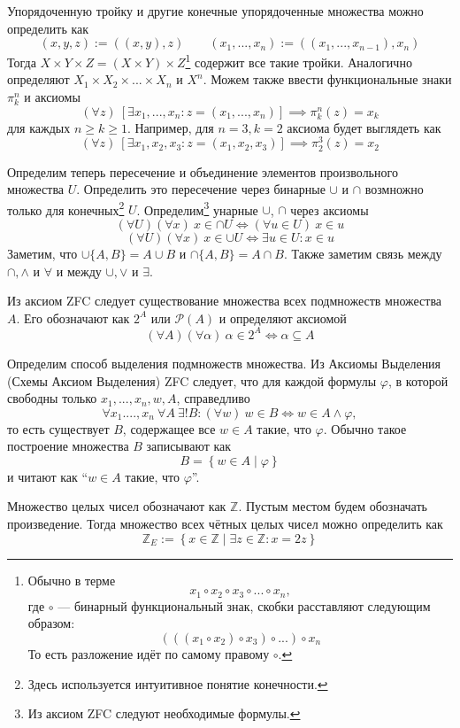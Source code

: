 Упорядоченную тройку и другие конечные упорядоченные множества
можно определить как
\[
  (x,y,z):=((x,y),z)\qquad (x_1,...,x_{n}):=((x_1,...,x_{n-1}),x_{n})
\]
Тогда $X\times Y\times Z=(X\times Y)\times Z$\footnote{
  Обычно в терме
  \[
    x_1\circ x_2\circ x_3\circ...\circ x_{n},
  \]
  где $\circ$ --- бинарный функциональный знак,
  скобки расставляют следующим образом:
  \[
    (((x_1\circ x_2)\circ x_3)\circ...)\circ x_{n}
  \]
  То есть разложение идёт по самому правому $\circ$.
} содержит все такие тройки.
Аналогично определяют $X_1\times X_2\times ...\times X_{n}$ и $X^{n}$.
Можем также ввести функциональные знаки $\pi_{k}^{n}$ и аксиомы
\[
  (\forall z)~[\exists x_1,...,x_{n}:z=(x_1,...,x_{n})]\implies \pi_{k}^{n}(z)=x_{k}
\]
для каждых $n\geq k\geq 1$. Например, для $n=3,k=2$ аксиома
будет выглядеть как
\[
  (\forall z)~[\exists x_1,x_2,x_3:z=(x_1,x_2,x_3)]\implies \pi_2^{3}(z)=x_2
\]

Определим теперь пересечение и объединение элементов произвольного множества $U$.
Определить это пересечение через бинарные $\cup$ и $\cap$
возмножно только для конечных\footnote{Здесь используется
  интуитивное понятие конечности.} $U$.
Определим\footnote{Из аксиом ZFC следуют необходимые формулы.} унарные $\cup$, $\cap$
через аксиомы
\[
  (\forall U)(\forall x)~x\in\cap U\iff (\forall u\in U)~x\in u
\]
\[
  (\forall U)(\forall x)~x\in\cup U\iff \exists u\in U:x\in u
\]
Заметим, что $\cup \{A,B\}=A\cup B$ и $\cap \{A,B\}=A\cap B$.
Также заметим связь между $\cap,\land$ и $\forall$ и между $\cup,\lor$ и $\exists$.

Из аксиом ZFC следует существование множества всех подмножеств множества $A$.
Его обозначают как $2^{A}$ или $\mathcal P(A)$ и определяют аксиомой
\[
  (\forall A)(\forall \alpha)~\alpha\in 2^{A}\iff \alpha\subseteq A
\]

Определим способ выделения подмножеств множества.
Из Аксиомы Выделения (Схемы Аксиом Выделения)
ZFC следует, что для каждой формулы $\varphi$, в которой свободны
только $x_1,...,x_{n},w,A$, справедливо
\[
  \forall x_1...., x_{n}~\forall A~\exists !B:
  (\forall w)~w\in B\iff w\in A\land \varphi,
\]
то есть существует $B$, содержащее все $w\in A$ такие, что $\varphi$.
Обычно такое построение множества $B$ записывают как
\[
  B=\left\{w\in A\;\big|\;\varphi\right\}
\]
и читают как ``$w\in A$ такие, что $\varphi$''.

\newcommand\Z{\mathbb Z}
Множество целых чисел обозначают как $\Z$\index{множество!целых чисел, $\Z$}.
Пустым местом будем обозначать произведение. Тогда
множество всех чётных целых чисел можно определить как
\[
  \Z_{E}:=\left\{x\in\Z\;\big|\;\exists z\in\Z:x=2z\right\}
\]


